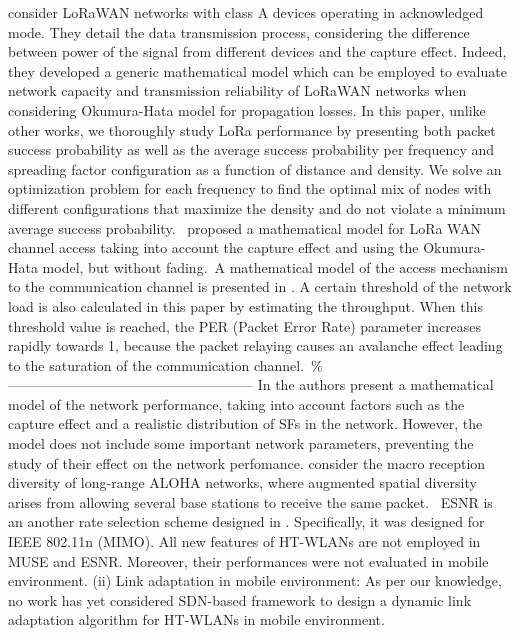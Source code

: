  \cite{bankov_mathematical_2017}   \citet{bankov_mathematical_2017} consider LoRaWAN networks with class A devices operating in acknowledged mode. They detail the data transmission process, considering the difference between power of the signal from different devices and the capture effect. Indeed, they developed a generic mathematical model which can be employed to evaluate network capacity and transmission reliability of LoRaWAN networks when considering Okumura-Hata model for propagation losses. In this paper, unlike other works, we thoroughly study LoRa performance by presenting both packet success probability as well as the average success probability per frequency and spreading factor configuration as a function of distance and density. We solve an optimization problem for each frequency to find the optimal mix of nodes with different configurations that maximize the density and do not violate a minimum average success probability.~\citet{bankov_mathematical_2017} proposed a mathematical model for LoRa WAN channel access taking into account the capture effect and using the Okumura-Hata model, but without fading.~A mathematical model of the access mechanism to the communication channel is presented in \cite{bankov_mathematical_2017}. A certain threshold of the network load is also calculated in this paper by estimating the throughput. When this threshold value is reached, the PER (Packet Error Rate) parameter increases rapidly towards 1, because the packet relaying causes an avalanche effect leading to the saturation of the communication channel.~\% ----------------------------------------------------- In \cite{bankov_mathematical_2017} the authors present a mathematical model of the network performance, taking into account factors such as the capture effect and a realistic distribution of SFs in the network. However, the model does not include some important network parameters, preventing the study of their effect on the network perfomance.   \newline 
 \cite{song_evaluation_2017}   \citet{song_evaluation_2017} consider the macro reception diversity of long-range ALOHA networks, where augmented spatial diversity arises from allowing several base stations to receive the same packet.~   \newline 
 \cite{halperin_predictable_2010}   ESNR is an another rate selection scheme designed in \cite{halperin_predictable_2010}. Specifically, it was designed for IEEE 802.11n (MIMO). All new features of HT-WLANs are not employed in MUSE and ESNR. Moreover, their performances were not evaluated in mobile environment. (ii) Link adaptation in mobile environment: As per our knowledge, no work has yet considered SDN-based framework to design a dynamic link adaptation algorithm for HT-WLANs in mobile environment.   \newline 
